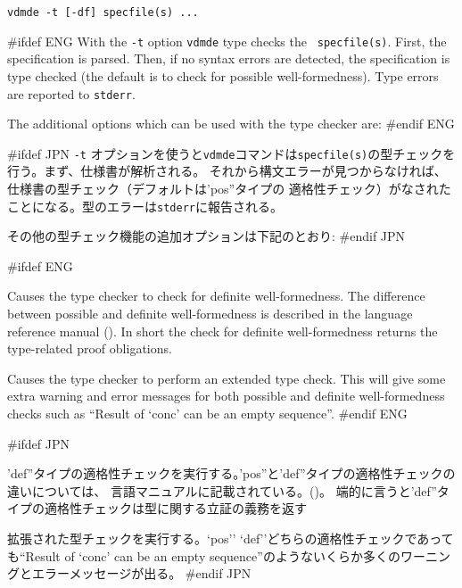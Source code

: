 \documentclass[\pformat,12pt]{article}
\newcommand{\vdmde}{vdmde}
\newcommand{\vdmde}{vppde}
\newcommand{\aaa}{\tt }
\begin{document}
{\tt \vdmde\ -t [-df] specfile(s) ...}

\vspace{0.5cm}

\noindent
#ifdef ENG
With the {\tt -t} option {\tt \vdmde} type checks the {\tt
  specfile(s)}.  First, the specification is parsed. Then, if no syntax
errors are detected, the specification is type checked (the default
is to check for possible well-formedness). Type errors are reported to
{\aaa stderr}.

The additional options which can be used with the type checker are:
#endif ENG

#ifdef JPN
{\tt -t} オプションを使うと{\tt \vdmde}コマンドは{\tt specfile(s)}の型チェックを行う。まず、仕様書が解析される。
それから構文エラーが見つからなければ、仕様書の型チェック（デフォルトは'pos''タイプの
適格性チェック）がなされたことになる。型のエラーは{\aaa stderr}に報告される。

その他の型チェック機能の追加オプションは下記のとおり:
#endif JPN

\begin{description}
#ifdef ENG
\item[{\tt -d}] Causes the type checker to check for definite
  well-formedness.  The difference between possible and definite
  well-formedness is described in the language reference manual
  (). In 
  short the check for definite well-formedness returns the
  type-related proof obligations.
  
\item[{\tt -f}] Causes the type checker to perform an extended type
  check.  This will give some extra warning and error messages for
  both possible and definite well-formedness checks such as ``Result
  of `conc' can be an empty sequence''.
#endif ENG

#ifdef JPN
\item[{\tt -d}]
  'def''タイプの適格性チェックを実行する。'pos''と'def''タイプの適格性チェックの違いについては、
  言語マニュアルに記載されている。()。
  端的に言うと'def''タイプの適格性チェックは型に関する立証の義務を返す
  
\item[{\tt -f}]
  拡張された型チェックを実行する。`pos'' `def''どちらの適格性チェックであっても``Result of `conc' 
  can be an empty sequence''のようないくらか多くのワーニングとエラーメッセージが出る。
#endif JPN
\end{description}
\end{document}
